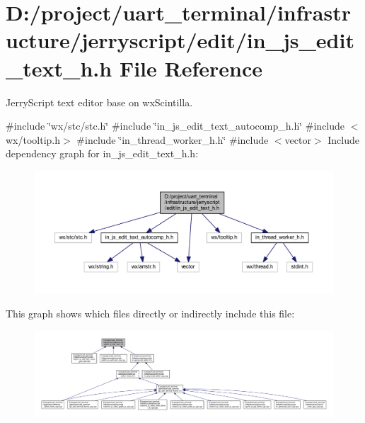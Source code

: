 \section{D\+:/project/uart\+\_\+terminal/infrastructure/jerryscript/edit/in\+\_\+js\+\_\+edit\+\_\+text\+\_\+h.h File Reference}
\label{in__js__edit__text__h_8h}


Jerry\+Script text editor base on wx\+Scintilla.  


{\ttfamily \#include \char`\"{}wx/stc/stc.\+h\char`\"{}}\newline
{\ttfamily \#include \char`\"{}in\+\_\+js\+\_\+edit\+\_\+text\+\_\+autocomp\+\_\+h.\+h\char`\"{}}\newline
{\ttfamily \#include $<$wx/tooltip.\+h$>$}\newline
{\ttfamily \#include \char`\"{}in\+\_\+thread\+\_\+worker\+\_\+h.\+h\char`\"{}}\newline
{\ttfamily \#include $<$vector$>$}\newline
Include dependency graph for in\+\_\+js\+\_\+edit\+\_\+text\+\_\+h.\+h\+:
\nopagebreak
\begin{figure}[H]
\begin{center}
\leavevmode
\includegraphics[width=350pt]{in__js__edit__text__h_8h__incl}
\end{center}
\end{figure}
This graph shows which files directly or indirectly include this file\+:
\nopagebreak
\begin{figure}[H]
\begin{center}
\leavevmode
\includegraphics[width=350pt]{in__js__edit__text__h_8h__dep__incl}
\end{center}
\end{figure}
